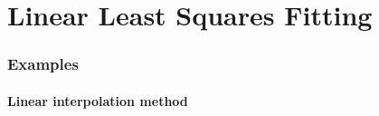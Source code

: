 \chapter{Linear Least Squares Fitting}
\label{chap:linear_least_squares_fitting}


\minitoc

%
%

\subsection{Examples}\label{subsec:interpol_examples}
\subsubsection{Linear interpolation method}
